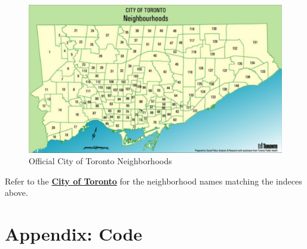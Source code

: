 \documentclass[]{article}
\begin{document}
\begin{figure}[H]

{\centering \includegraphics[width=0.95\linewidth]{toronto-hoods} 

}

\caption{\label{fig:figs}Official City of Toronto Neighborhoods}\label{fig:unnamed-chunk-24}
\end{figure}

Refer to the
\textbf{\href{https://www.toronto.ca/city-government/data-research-maps/neighbourhoods-communities/neighbourhood-profiles/}{City
of Toronto}} for the neighborhood names matching the indeces above.

\pagebreak

\newpage

\section{Appendix: Code}\label{appendix-code}
\end{document}

